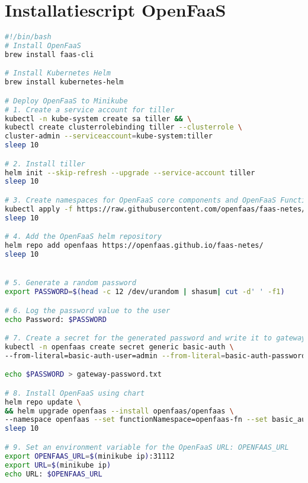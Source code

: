 \section{Installatiescript OpenFaaS}
\label{sec:installatie-openfaas}
\begin{lstlisting}[language=bash]
#!/bin/bash
# Install OpenFaaS
brew install faas-cli

# Install Kubernetes Helm
brew install kubernetes-helm

# Deploy OpenFaaS to Minikube
# 1. Create a service account for tiller
kubectl -n kube-system create sa tiller && \
kubectl create clusterrolebinding tiller --clusterrole \
cluster-admin --serviceaccount=kube-system:tiller
sleep 10

# 2. Install tiller
helm init --skip-refresh --upgrade --service-account tiller
sleep 10

# 3. Create namespaces for OpenFaaS core components and OpenFaaS Functions
kubectl apply -f https://raw.githubusercontent.com/openfaas/faas-netes/master/namespaces.yml
sleep 10

# 4. Add the OpenFaaS helm repository
helm repo add openfaas https://openfaas.github.io/faas-netes/
sleep 10


# 5. Generate a random password
export PASSWORD=$(head -c 12 /dev/urandom | shasum| cut -d' ' -f1)

# 6. Log the password value to the user
echo Password: $PASSWORD

# 7. Create a secret for the generated password and write it to gateway-password.txt
kubectl -n openfaas create secret generic basic-auth \
--from-literal=basic-auth-user=admin --from-literal=basic-auth-password="$PASSWORD"

echo $PASSWORD > gateway-password.txt

# 8. Install OpenFaaS using chart
helm repo update \
&& helm upgrade openfaas --install openfaas/openfaas \
--namespace openfaas --set functionNamespace=openfaas-fn --set basic_auth=true
sleep 10

# 9. Set an environment variable for the OpenFaaS URL: OPENFAAS_URL
export OPENFAAS_URL=$(minikube ip):31112
export URL=$(minikube ip)
echo URL: $OPENFAAS_URL
\end{lstlisting}